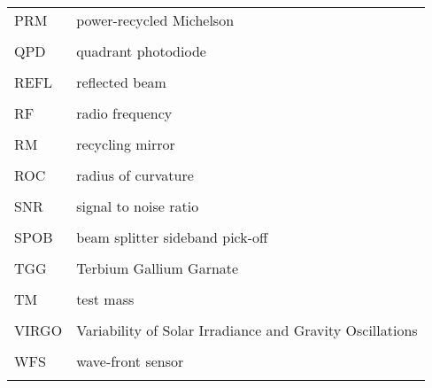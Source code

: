 \singlespacing
\begin{tabular}{lp{5in}}
PRM & power-recycled Michelson \\
\\
QPD & quadrant photodiode \\
\\ 
REFL & reflected beam \\
\\
 RF & radio frequency \\
\\
 RM & recycling mirror \\
\\
ROC & radius of curvature \\
\\
 SNR & signal to noise ratio \\
\\
SPOB & beam splitter sideband pick-off \\
\\
TGG & Terbium Gallium Garnate \\
\\
TM & test mass \\
\\
VIRGO & Variability of Solar Irradiance and Gravity Oscillations \\
\\
WFS & wave-front sensor \\
\\
\end{tabular}
\doublespacing

